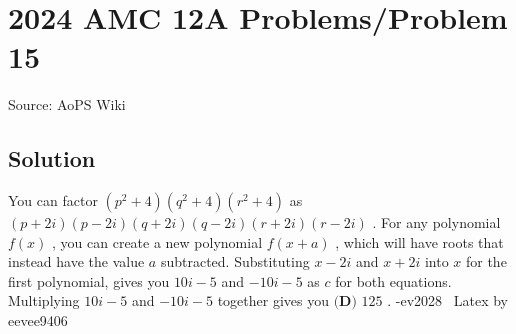 \documentclass[12pt]{article}
\begin{document}
\section*{{2024 AMC 12A Problems/Problem 15}}
Source: AoPS Wiki

\subsection*{Solution}
You can factor $(p^2 + 4)(q^2 + 4)(r^2 + 4)$ as $(p+2i)(p-2i)(q+2i)(q-2i)(r+2i)(r-2i)$ . For any polynomial $f(x)$ , you can create a new polynomial $f(x+a)$ , which will have roots that instead have the value $a$ subtracted. Substituting $x-2i$ and $x+2i$ into $x$ for the first polynomial, gives you $10i-5$ and $-10i-5$ as $c$ for both equations. Multiplying $10i-5$ and $-10i-5$ together gives you $\boxed{\textbf{(D) }125}$ . -ev2028 ~Latex by eevee9406
\end{document}
